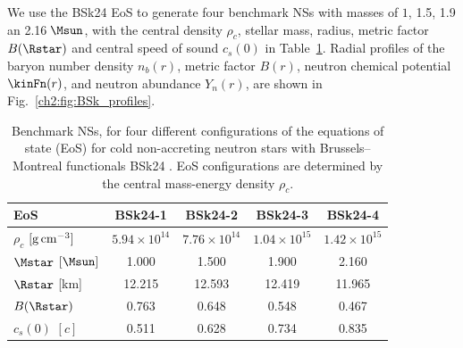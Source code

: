 We use the BSk24 EoS to generate four benchmark NSs with masses of $1$, 1.5, 1.9 an 2.16$\;\Msun$, with the central density $\rho_c$, stellar mass, radius, metric factor $B(\Rstar)$ and central speed of sound $c_s(0)$ in Table~\ref{ch2:tab:BSk_configs}. 
Radial profiles of the baryon number density $n_b(r)$, metric factor $B(r)$, neutron chemical potential $\kinFn(r)$, and neutron abundance  $Y_n(r)$, are shown in Fig.~\ref{ch2:fig:BSk_profiles}. 



\begin{table}[tb]
    \centering
    \begin{tabular}{l c c c c}
    \toprule
    \bf EoS & \bf BSk24-1 & \bf BSk24-2 & \bf BSk24-3 & \bf BSk24-4 \\ \midrule\midrule
    $\rho_c$ $[\rm{g \, cm^{-3}}]$ & $5.94 \times 10^{14}$   & $7.76 \times 10^{14}$ & $1.04 \times 10^{15}$ & $1.42 \times 10^{15}$  \\
    $\Mstar$ $[\Msun]$ & 1.000 & 1.500 & 1.900 & 2.160  \\
    $\Rstar$ [km] & 12.215  & 12.593 & 12.419 & 11.965 \\
    $B(\Rstar)$ & 0.763 & 0.648 & 0.548 & 0.467\\
    $c_s(0)$ $[c]$ & 0.511 & 0.628 & 0.734 & 0.835 \\
    \bottomrule
    \end{tabular} 
    \caption{Benchmark NSs, for four different configurations of the equations of state (EoS) for cold non-accreting neutron stars with Brussels–Montreal functionals BSk24 \cite{Pearson:2018tkr_Unifiedequationsstate}. EoS configurations are determined by the central mass-energy density $\rho_c$.}
    \label{ch2:tab:BSk_configs}
\end{table} 


